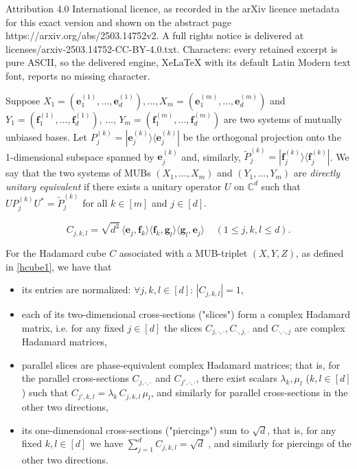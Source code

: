 \documentclass[10pt,a4paper]{amsart}
\newcommand{\Co}{\ensuremath{\mathbb{C}}}
\newenvironment{definition}{\begin{defi} \rm}{\end{defi}}
\newcommand{\eb}{\ensuremath{\mathbf{e}}}
\newcommand{\fb}{\ensuremath{\mathbf{f}}}
\newcommand{\gb}{\ensuremath{\mathbf{g}}}
\begin{document}
Attribution 4.0 International licence, as recorded in the arXiv licence metadata for this exact version and shown on the abstract page https://arxiv.org/abs/2503.14752v2. A full rights notice is delivered at licenses/arxiv-2503.14752-CC-BY-4.0.txt. Characters: every retained excerpt is pure ASCII, so the delivered engine, XeLaTeX with its default Latin Modern text font, reports no missing character.
\begin{definition}\label{du}
Suppose $X_1=(\eb^{(1)}_1,\ldots,\eb^{(1)}_d), \dots, X_m=(\eb^{(m)}_1,\ldots,\eb^{(m)}_d)$
 and $Y_1=(\fb^{(1)}_1,\ldots,\fb^{(1)}_d)$, $\dots$, $Y_m=(\fb^{(m)}_1,\ldots,\fb^{(m)}_d)$ are two systems of mutually unbiased bases. Let $P^{(k)}_j=|\eb^{(k)}_j\rangle \langle \eb^{(k)}_j|$ be the orthogonal projection onto the 1-dimensional subspace spanned by $\eb^{(k)}_j$ and, similarly, $\tilde{P}^{(k)}_j=|\fb^{(k)}_j\rangle \langle \fb^{(k)}_j|$.  
 We say that the two systems of MUBs $(X_1, \dots, X_m)$ and $(Y_1, \dots, Y_m)$ are {\it directly unitary equivalent} if there exists a unitary operator $U$ on $\Co^d$ such that $UP^{(k)}_jU^\ast = \tilde{P}^{(k)}_j$ for all $k \in [m]$ and $ j\in [d]$. 
\end{definition}

\begin{equation}\label{hcube1}
C_{j,k,l}= \sqrt{d^3}\,
\langle \eb_j, \fb_k\rangle 
\langle \fb_k, \gb_l\rangle
\langle \gb_l, \eb_j\rangle \;\;\;\; (1\le j,k,l\le d).
\end{equation}

\begin{proposition}\label{hcube}
For the Hadamard cube $C$ associated with a MUB-triplet $(X, Y, Z)$, as defined in \eqref{hcube1}, we have that
\begin{itemize}
    \item[i)] its entries are normalized: $\forall j,k,l\in[d]$: $|C_{j,k,l}|=1$,
    \item[ii)] each of its two-dimensional cross-sections ("slices") form a complex Hadamard matrix, i.e. for any fixed $j\in [d]$ the slices $C_{j,\cdot,\cdot}, C_{\cdot,j,\cdot}$ and $C_{\cdot,\cdot,j}$ are complex Hadamard matrices, 
    \item[iii)] parallel slices are phase-equivalent complex 
    Hadamard matrices; that is, for the parallel cross-sections $C_{j,\cdot,\cdot}$ and 
    $C_{j',\cdot,\cdot}$,  there exist scalars $\lambda_k, \mu_l$ ($k, l\in [d]$) such that $C_{j',k,l}=\lambda_k \, C_{j,k,l}\,\mu_l$, and similarly for parallel cross-sections in the other two directions,

    \item[iv)] its one-dimensional cross-sections ("piercings") sum to $\sqrt{d}$, that is, for any fixed $k,l\in[d]$ we have $\sum_{j=1}^d C_{j,k,l}=\sqrt{d}$ , and similarly for piercings of the other two directions.
\end{itemize}
\end{proposition}
\end{document}
